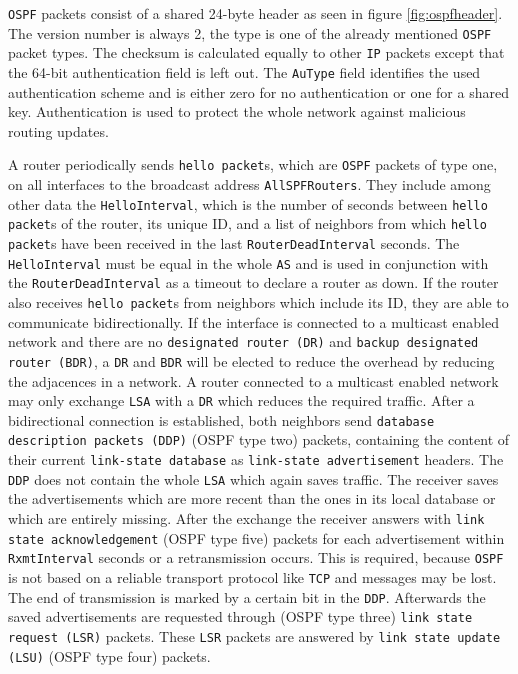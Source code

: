 \documentclass{acm_proc_article-sp}
\begin{document}
\texttt{OSPF} packets consist of a shared 24-byte header as seen in figure \ref{fig:ospfheader}. The version number is always 2, the type is one of the already mentioned \texttt{OSPF} packet types. The checksum is calculated equally to other \texttt{IP} packets except that the 64-bit authentication field is left out. The \texttt{AuType} field identifies the used authentication scheme and is either zero for no authentication or one for a shared key. Authentication is used to protect the whole network against malicious routing updates.

A router periodically sends \texttt{hello packet}s, which are \texttt{OSPF} packets of type one, on all interfaces to the broadcast address \texttt{AllSPFRouters}. They include among other data the \texttt{HelloInterval}, which is the number of seconds between \texttt{hello packet}s of the router, its unique ID, and a list of neighbors from which \texttt{hello packet}s have been received in the last \texttt{RouterDeadInterval} seconds. The \texttt{HelloInterval} must be equal in the whole \texttt{AS} and is used in conjunction with the \texttt{RouterDeadInterval} as a timeout to declare a router as down. If the router also receives \texttt{hello packet}s from neighbors which include its ID, they are able to communicate bidirectionally. If the interface is connected to a multicast enabled network and there are no \texttt{designated router (DR)} and \texttt{backup designated router (BDR)}, a \texttt{DR} and \texttt{BDR} will be elected to reduce the overhead by reducing the adjacences in a network. A router connected to a multicast enabled network may only exchange \texttt{LSA} with a \texttt{DR} which reduces the required traffic. After a bidirectional connection is established, both neighbors send \texttt{database description packets (DDP)} (OSPF type two) packets, containing the content of their current \texttt{link-state database} as \texttt{link-state advertisement} headers. The \texttt{DDP} does not contain the whole \texttt{LSA} which again saves traffic. The receiver saves the advertisements which are more recent than the ones in its local database or which are entirely missing. After the exchange the receiver answers with \texttt{link state acknowledgement} (OSPF type five) packets for each advertisement within \texttt{RxmtInterval} seconds or a retransmission occurs. This is required, because \texttt{OSPF} is not based on a reliable transport protocol like \texttt{TCP} and messages may be lost. The end of transmission is marked by a certain bit in the \texttt{DDP}. Afterwards the saved advertisements are requested through (OSPF type three) \texttt{link state request (LSR)} packets. These \texttt{LSR} packets are answered by \texttt{link state update (LSU)} (OSPF type four) packets.
\end{document}

